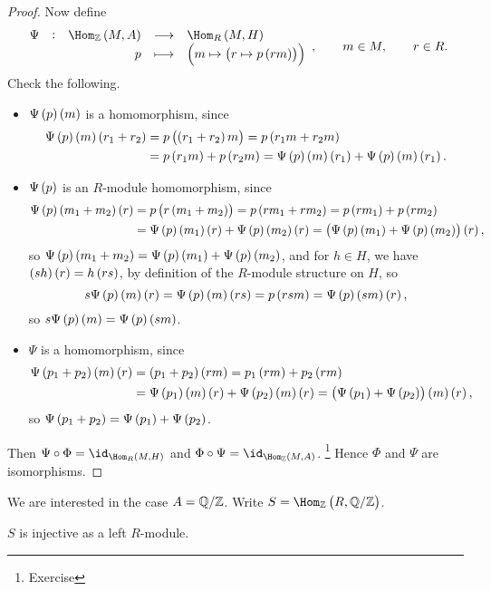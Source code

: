 \begin{proof}
Now define
$$ \function[\Psi]{\Hom_\ZZ\br{M, A}}{\Hom_R\br{M, H}}{p}{\br{m \mapsto \br{r \mapsto p\br{rm}}}}, \qquad m \in M, \qquad r \in R. $$
Check the following.
\begin{itemize}
\item $ \Psi\br{p}\br{m} $ is a homomorphism, since
\begin{align*}
\Psi\br{p}\br{m}\br{r_1 + r_2}
& = p\br{\br{r_1 + r_2}m}
= p\br{r_1m + r_2m} \\
& = p\br{r_1m} + p\br{r_2m}
= \Psi\br{p}\br{m}\br{r_1} + \Psi\br{p}\br{m}\br{r_1}.
\end{align*}
\item $ \Psi\br{p} $ is an $ R $-module homomorphism, since
\begin{align*}
\Psi\br{p}\br{m_1 + m_2}\br{r}
& = p\br{r\br{m_1 + m_2}}
= p\br{rm_1 + rm_2}
= p\br{rm_1} + p\br{rm_2} \\
& = \Psi\br{p}\br{m_1}\br{r} + \Psi\br{p}\br{m_2}\br{r}
= \br{\Psi\br{p}\br{m_1} + \Psi\br{p}\br{m_2}}\br{r},
\end{align*}
so $ \Psi\br{p}\br{m_1 + m_2} = \Psi\br{p}\br{m_1} + \Psi\br{p}\br{m_2} $, and for $ h \in H $, we have $ \br{sh}\br{r} = h\br{rs} $, by definition of the $ R $-module structure on $ H $, so
$$ s\Psi\br{p}\br{m}\br{r} = \Psi\br{p}\br{m}\br{rs} = p\br{rsm} = \Psi\br{p}\br{sm}\br{r}, $$
so $ s\Psi\br{p}\br{m} = \Psi\br{p}\br{sm} $.
\item $ \Psi $ is a homomorphism, since
\begin{align*}
\Psi\br{p_1 + p_2}\br{m}\br{r}
& = \br{p_1 + p_2}\br{rm}
= p_1\br{rm} + p_2\br{rm} \\
& = \Psi\br{p_1}\br{m}\br{r} + \Psi\br{p_2}\br{m}\br{r}
= \br{\Psi\br{p_1} + \Psi\br{p_2}}\br{m}\br{r},
\end{align*}
so $ \Psi\br{p_1 + p_2} = \Psi\br{p_1} + \Psi\br{p_2} $.
\end{itemize}
Then $ \Psi \circ \Phi = \id_{\Hom_R\br{M, H}} $ and $ \Phi \circ \Psi = \id_{\Hom_\ZZ\br{M, A}} $. \footnote{Exercise} Hence $ \Phi $ and $ \Psi $ are isomorphisms.
\end{proof}

We are interested in the case $ A = \mathbb{Q} / \mathbb{Z} $. Write $ S = \Hom_\ZZ\br{R, \QQ / \ZZ} $.


\begin{proposition}
$ S $ is injective as a left $ R $-module.
\end{proposition}

